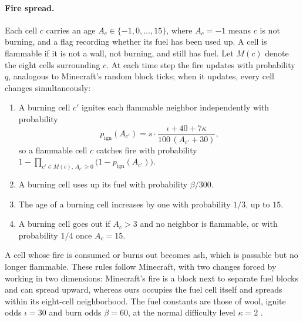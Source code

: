 \documentclass[14pt]{article}
\theoremstyle{definition}
\begin{document}
\paragraph{Fire spread.} Each cell $c$ carries an age $A_c \in \{-1, 0, \dots, 15\}$,
where $A_c = -1$ means $c$ is not burning, and a flag recording whether its fuel has
been used up. A cell is flammable if it is not a wall, not burning, and still has fuel.
Let $M(c)$ denote the eight cells surrounding $c$. At each time step the fire updates
with probability $q$, analogous to Minecraft's random block ticks; when it updates,
every cell changes simultaneously:
\begin{enumerate}
  \item A burning cell $c'$ ignites each flammable neighbor independently with
  probability
  \begin{equation}\label{eq:fire_spread}
    p_{\text{ign}}(A_{c'}) = s \cdot \frac{\iota + 40 + 7\kappa}{100\,(A_{c'} + 30)},
  \end{equation}
  so a flammable cell $c$ catches fire with probability
  $1 - \prod_{c' \in M(c),\, A_{c'} \ge 0} \bigl(1 - p_{\text{ign}}(A_{c'})\bigr)$.
  \item A burning cell uses up its fuel with probability $\beta / 300$.
  \item The age of a burning cell increases by one with probability $1/3$, up to $15$.
  \item A burning cell goes out if $A_c > 3$ and no neighbor is flammable, or with
  probability $1/4$ once $A_c = 15$.
\end{enumerate}
A cell whose fire is consumed or burns out becomes ash, which is passable but no
longer flammable. These rules follow Minecraft, with two changes forced by working in
two dimensions: Minecraft's fire is a block next to separate fuel blocks and can spread
upward, whereas ours occupies the fuel cell itself and spreads within its eight-cell
neighborhood. The fuel constants are those of wool, ignite odds $\iota = 30$ and burn
odds $\beta = 60$, at the normal difficulty level $\kappa = 2$ \cite{minecraftfire}.
\end{document}
